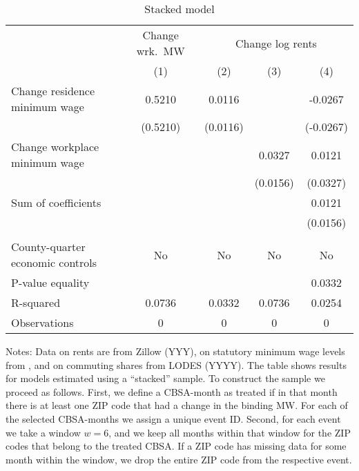 \begin{table}[hbt!] \centering
	\caption{Stacked model}
	\label{tab:stacked}
	\begin{tabular}{l*{4}{c}}
		\toprule
		& \multicolumn{1}{c}{Change wrk.\ MW}
		& \multicolumn{3}{c}{Change log rents}                            \\ \cmidrule(lr){2-2}\cmidrule(lr){3-5}
		                                   & (1)   & (2)   & (3)   & (4)      \\ \midrule
		Change residence minimum wage      &  0.5210  &  0.0116  &       &  -0.0267     \\
		                                   & (0.5210) & (0.0116) &       & (-0.0267)    \\
		Change workplace minimum wage      &       &       &  0.0327  & 0.0121      \\
		                                   &       &       & (0.0156) & (0.0327)    \\ \midrule
		Sum of coefficients                &       &       &       &  0.0121     \\
		                                   &       &       &       & (0.0156)    \\
		                                   &       &       &       &          \\ \midrule
		County-quarter economic controls   &  No   & No   & No     & No      \\
		P-value equality                   &       &       &       & 0.0332      \\
		R-squared                          &  0.0736  &  0.0332  &  0.0736  & 0.0254      \\
		Observations                       & 0  & 0  & 0  & 0     \\\bottomrule
	\end{tabular}
    
    \begin{minipage}{.95\textwidth} \footnotesize
        \vspace{2mm}
        Notes: Data on rents are from Zillow (YYY), on statutory minimum wage levels
        from \textcite{VaghulZipperer2016, BerkeleyLaborCenter}, and on commuting 
        shares from LODES (YYYY).
        The table shows results for models estimated using a ``stacked'' sample.
        To construct the sample we proceed as follows.
        First, we define a CBSA-month as treated if in that month there is at least one ZIP 
        code that had a change in the binding MW.
        For each of the selected CBSA-months we assign a unique event ID. 
        Second, for each event we take a window $w = 6$, and we keep all months within that 
        window for the ZIP codes that belong to the treated CBSA.
        If a ZIP code has missing data for some month within the window, we drop the entire 
        ZIP code from the respective event. 
    \end{minipage}
\end{table}
